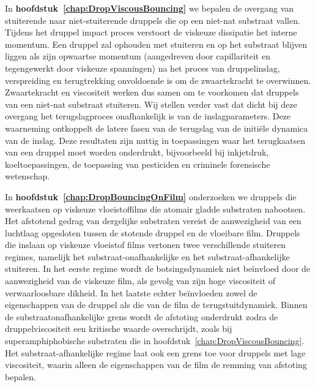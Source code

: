 In \textbf{hoofdstuk~\ref{chap:DropViscousBouncing}} we bepalen de overgang van stuiterende naar niet-stuite\-ren\-de druppels die op een niet-nat substraat vallen. Tijdens het druppel impact proces verstoort de viskeuze dissipatie het interne momentum. Een druppel zal ophouden met stuiteren en op het substraat blijven liggen als zijn opwaartse momentum (aangedreven door capillariteit en tegengewerkt door viskeuze spanningen)  na het proces van druppelinslag, verspreiding en terugtrekking onvoldoende is om de zwaartekracht te overwinnen. Zwaar\-tek\-racht en viscositeit werken dus samen om te voorkomen dat druppels van een niet-nat substraat stuiteren. Wij stellen verder vast dat dicht bij deze overgang het terugslagproces onafhankelijk is van de inslagparameters. Deze waarneming ontkoppelt de latere fasen van de terugslag van de initi{\"e}le dynamica van de inslag. Deze resultaten zijn nuttig in toepassingen waar het terugkaatsen van een druppel moet worden onderdrukt, bijvoorbeeld bij inkjetdruk, koeltoepassingen, de toepassing van pesticiden en criminele forensische wetenschap.

In \textbf{hoofdstuk~\ref{chap:DropBouncingOnFilm}} onderzoeken we druppels die weerkaatsen op viskeuze vloeistoffilms die atomair gladde substraten nabootsen. Het afstotend gedrag van dergelijke substraten vereist de aanwezigheid van een luchtlaag opgesloten tussen de stotende druppel en de vloeibare film. Druppels die inslaan op viskeuze vloeistof films vertonen twee verschillende stuiteren regimes, namelijk het substraat-onafhankelijke en het substraat-afhankelijke stuiteren. In het eerste regime wordt de botsingsdynamiek niet be{\"i}nvloed door de aanwezigheid van de viskeuze film, als gevolg van zijn hoge viscositeit of verwaarloosbare dikheid. In het laatste echter beïnvloeden zowel de eigenschappen van de druppel als die van de film de terugstuitdynamiek. Binnen de substraatonafhankelijke grens wordt de afstoting onderdrukt zodra de druppelviscositeit een kritische waarde overschrijdt, zoals bij superamphiphobische substraten die in hoofdstuk~\ref{chap:DropViscousBouncing}. Het substraat-afhankelijke regime laat ook een grens toe voor druppels met lage viscositeit, waarin alleen de eigenschappen van de film de remming van afstoting bepalen.

